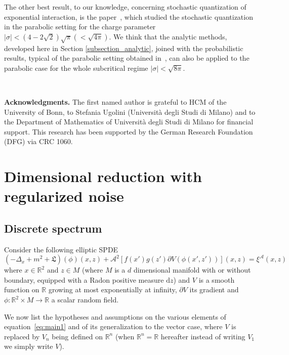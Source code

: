 \documentclass[a4paper,10pt]{article}
\newcommand{\mathd}{\mathrm{d}}
\newcommand{\tmtextbf}[1]{{\bfseries{#1}}}
\begin{document}
The other best result, to our knowledge, concerning stochastic quantization of
exponential interaction, is the paper~{\cite{Garban2018}}, which studied the
stochastic quantization in the parabolic setting for the charge parameter $|
\sigma | < \left( 4 - 2 \sqrt{2} \right) \sqrt{\pi} \left( < \sqrt{4 \pi}
\right)$. We think that the analytic methods, developed here in Section
\ref{subsection_analytic}, joined with the probabilistic results, typical of
the parabolic setting obtained in~{\cite{Garban2018}}, can also be applied to
the parabolic case for the whole subcritical regime $| \sigma | < \sqrt{8
\pi}$.

\

\tmtextbf{Acknowledgments.} The first named author is grateful to HCM of the
University of Bonn, to Stefania Ugolini (Universit{\`a} degli Studi di Milano)
and to the Department of Mathematics of Universit{\`a} degli Studi di Milano
for financial support. This research has been supported by the German Research
Foundation (DFG) via CRC 1060.

\section{Dimensional reduction with regularized noise}\label{section_discrete}

\subsection{Discrete spectrum}\label{section_discrete1}

Consider the following elliptic SPDE
\begin{equation}
  (- \Delta_x + m^2 + \mathfrak{L}) (\phi) (x, z) + \mathcal{A}^2 [f (x') g
  (z') \partial V (\phi (x', z'))] (x, z) = \xi^{\mathcal{A}} (x, z) 
  \label{eq:main1}
\end{equation}
where $x \in \mathbb{R}^2$ and $z \in M$ (where $M$ is a $d$ dimensional
manifold with or without boundary, equipped with a Radon positive measure
$\mathd z$) and $V$ is a smooth function on $\mathbb{R}$ growing at most
exponentially at infinity, $\partial V$ its gradient and $\phi : \mathbb{R}^2
\times M \rightarrow \mathbb{R}$ a scalar random field.

We now list the hypotheses and assumptions on the various elements of
equation~{\eqref{eq:main1}} and of its generalization to the vector case,
where $V$ is replaced by $V_n$ being defined on $\mathbb{R}^n$ (when
$\mathbb{R}^n =\mathbb{R}$ hereafter instead of writing $V_1$ we simply write
$V$).
\end{document}
